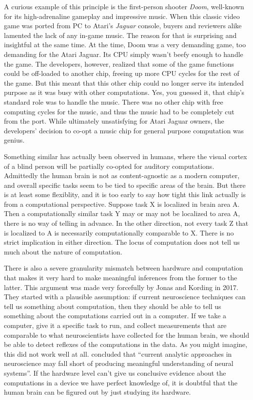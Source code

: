 A curious example of this principle is the first-person shooter \emph{Doom}, well-known for its high-adrenaline gameplay and impressive music.
When this classic video game was ported from PC to Atari's \emph{Jaguar} console, buyers and reviewers alike lamented the lack of any in-game music.
The reason for that is surprising and insightful at the same time.
At the time, Doom was a very demanding game, too demanding for the Atari Jaguar.
Its CPU simply wasn't beefy enough to handle the game.
The developers, however, realized that some of the game functions could be off-loaded to another chip, freeing up more CPU cycles for the rest of the game.
But this meant that this other chip could no longer serve its intended purpose as it was busy with other computations.
Yes, you guessed it, that chip's standard role was to handle the music. 
There was no other chip with free computing cycles for the music, and thus the music had to be completely cut from the port.
While ultimately unsatisfying for Atari Jaguar owners, the developers' decision to co-opt a music chip for general purpose computation was genius.

Something similar has actually been observed in humans, where the visual cortex of a blind person will be partially co-opted for auditory computations.
Admittedly the human brain is not as content-agnostic as a modern computer, and overall specific tasks seem to be tied to specific areas of the brain.
But there is at least some flexiblity, and it is too early to say how tight this link actually is from a computational perspective.
Suppose task X is localized in brain area A\@.
Then a computationally similar task Y may or may not be localized to area A\@, there is no way of telling in advance.
In the other direction, not every task Z that is localized to A is necessarily computationally comparable to X\@.
There is no strict implication in either direction.
The locus of computation does not tell us much about the nature of computation.

There is also a severe granularity mismatch between hardware and computation that makes it very hard to make meaningful inferences from the former to the latter.
This argument was made very forcefully by Jonas and Kording in 2017.
They started with a plausible assumption: if current neuroscience techniques can tell us something about computation, then they should be able to tell us something about the computations carried out in a computer.
If we take a computer, give it a specific task to run, and collect measurements that are comparable to what neuroscientists have collected for the human brain, we should be able to detect reflexes of the computations in the data.
As you might imagine, this did not work well at all.
\citet[1]{JonasKording17} concluded that ``current analytic approaches in neuroscience may fall short of producing meaningful understanding of neural systems''.
If the hardware level can't give us conclusive evidence about the computations in a device we have perfect knowledge of, it is doubtful that the human brain can be figured out by just studying its hardware.

